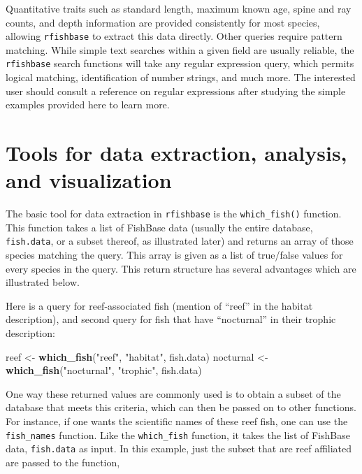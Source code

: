 \documentclass[author-year]{elsarticle} %
\newenvironment{Shaded}{}{}
\newcommand{\KeywordTok}[1]{\textcolor[rgb]{0.00,0.44,0.13}{\textbf{{#1}}}}
\newcommand{\StringTok}[1]{\textcolor[rgb]{0.25,0.44,0.63}{{#1}}}
\newcommand{\NormalTok}[1]{{#1}}
\begin{document}
Quantitative traits such as standard length, maximum known age, spine
and ray counts, and depth information are provided consistently for most
species, allowing \texttt{rfishbase} to extract this data directly.
Other queries require pattern matching. While simple text searches
within a given field are usually reliable, the \texttt{rfishbase} search
functions will take any regular expression query, which permits logical
matching, identification of number strings, and much more. The
interested user should consult a reference on regular expressions after
studying the simple examples provided here to learn more.

\section{Tools for data extraction, analysis, and visualization}

The basic tool for data extraction in \texttt{rfishbase} is the
\texttt{which\_fish()} function. This function takes a list of FishBase
data (usually the entire database, \texttt{fish.data}, or a subset
thereof, as illustrated later) and returns an array of those species
matching the query. This array is given as a list of true/false values
for every species in the query. This return structure has several
advantages which are illustrated below.

Here is a query for reef-associated fish (mention of ``reef'' in the
habitat description), and second query for fish that have ``nocturnal''
in their trophic description:

\begin{Shaded}
\begin{Highlighting}[]
\NormalTok{reef <- }\KeywordTok{which_fish}\NormalTok{(}\StringTok{"reef"}\NormalTok{, }\StringTok{"habitat"}\NormalTok{, fish.data)}
\NormalTok{nocturnal <- }\KeywordTok{which_fish}\NormalTok{(}\StringTok{"nocturnal"}\NormalTok{, }\StringTok{"trophic"}\NormalTok{, fish.data)}
\end{Highlighting}
\end{Shaded}
One way these returned values are commonly used is to obtain a subset of
the database that meets this criteria, which can then be passed on to
other functions. For instance, if one wants the scientific names of
these reef fish, one can use the \texttt{fish\_names} function. Like the
\texttt{which\_fish} function, it takes the list of FishBase data,
\texttt{fish.data} as input. In this example, just the subset that are
reef affiliated are passed to the function,
\end{document}

